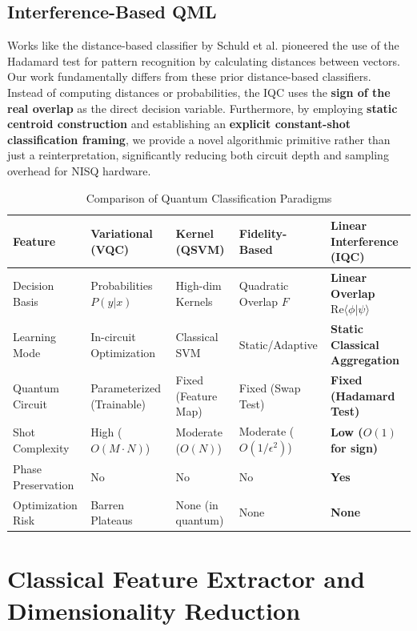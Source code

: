 \documentclass[conference]{IEEEtran}
\begin{document}
\subsection{Interference-Based QML}

Works like the distance-based classifier by Schuld et al. \cite{schuld2017distance,schuld2018book} pioneered the use of the Hadamard test for pattern recognition by calculating distances between vectors. Our work fundamentally differs from these prior distance-based classifiers. Instead of computing distances or probabilities, the IQC uses the \textbf{sign of the real overlap} as the direct decision variable. Furthermore, by employing \textbf{static centroid construction} and establishing an \textbf{explicit constant-shot classification framing}, we provide a novel algorithmic primitive rather than just a reinterpretation, significantly reducing both circuit depth and sampling overhead for NISQ hardware.

\begin{table}[t]
\centering
\caption{Comparison of Quantum Classification Paradigms}
\label{tab:comparison}
\begin{tabular}{@{}lllll@{}}
\toprule
Feature & Variational (VQC) & Kernel (QSVM) & Fidelity-Based & \textbf{Linear Interference (IQC)} \\ \midrule
Decision Basis & Probabilities $P(y|x)$ & High-dim Kernels & Quadratic Overlap $F$ & \textbf{Linear Overlap $\text{Re}\langle \phi|\psi \rangle$} \\
Learning Mode & In-circuit Optimization & Classical SVM & Static/Adaptive & \textbf{Static Classical Aggregation} \\
Quantum Circuit & Parameterized (Trainable) & Fixed (Feature Map) & Fixed (Swap Test) & \textbf{Fixed (Hadamard Test)} \\
Shot Complexity & High ($O(M \cdot N)$) & Moderate ($O(N)$) & Moderate ($O(1/\epsilon^2)$) & \textbf{Low ($O(1)$ for sign)} \\
Phase Preservation & No & No & No & \textbf{Yes} \\
Optimization Risk & Barren Plateaus & None (in quantum) & None & \textbf{None} \\ \bottomrule
\end{tabular}
\end{table}

\section{Classical Feature Extractor and Dimensionality Reduction}
\end{document}
